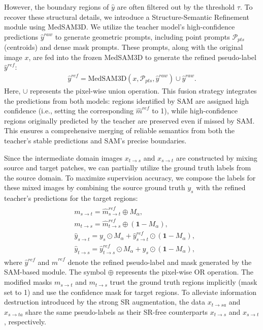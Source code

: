 However, the boundary regions of $\hat{y}$ are often filtered out by the threshold $\tau$. To recover these structural details, we introduce a Structure-Semantic Refinement module using MedSAM3D. We utilize the teacher model's high-confidence predictions $\hat{y}^{raw}$ to generate geometric prompts, including point prompts $\mathcal{P}_{pts}$ (centroids) and dense mask prompts. These prompts, along with the original image $x$, are fed into the frozen MedSAM3D to generate the refined pseudo-label $\hat{y}^{ref}$:
\begin{align} \label{eq4}
    \hat{y}^{ref} = \text{MedSAM3D}(x, \mathcal{P}_{pts}, \hat{y}^{raw}) \cup \hat{y}^{raw}.
\end{align}
Here, $\cup$ represents the pixel-wise union operation. This fusion strategy integrates the predictions from both models: regions identified by SAM are assigned high confidence (i.e., setting the corresponding $\hat{m}^{ref}$ to 1), while high-confidence regions originally predicted by the teacher are preserved even if missed by SAM. This ensures a comprehensive merging of reliable semantics from both the teacher's stable predictions and SAM's precise boundaries.

Since the intermediate domain images $x_{t\to s}$ and $x_{s\to t}$ are constructed by mixing source and target patches, we can partially utilize the ground truth labels from the source domain. To maximize supervision accuracy, we compose the labels for these mixed images by combining the source ground truth $y_{s}$ with the refined teacher's predictions for the target regions:
\begin{align}\label{eq5}
    \begin{split} 
           & m_{s\to t}  = \hat{m}_{s \to t}^{ref} \oplus \mathit{M}_{\alpha}, \\
           & m_{t\to s}  = \hat{m}_{t \to s}^{ref} \oplus (\mathbf{1} - \mathit{M}_{\alpha}),\\
           & \hat{y}_{s\to t} = y_{s} \odot \mathit{M}_{\alpha} + \hat{y}_{s\to t}^{ref} \odot (\mathbf{1} - \mathit{M}_{\alpha}), \\
           & \hat{y}_{t\to s} = \hat{y}_{t \to s}^{ref} \odot \mathit{M}_{\alpha} + y_{s} \odot (\mathbf{1} - \mathit{M}_{\alpha}),             
    \end{split} 
\end{align}
where $\hat{y}^{ref}$ and $\hat{m}^{ref}$ denote the refined pseudo-label and mask generated by the SAM-based module. The symbol $\oplus$ represents the pixel-wise OR operation. The modified masks $m_{s\to t}$ and $m_{t\to s}$ trust the ground truth regions implicitly (mask set to 1) and use the confidence mask for target regions. To alleviate information destruction introduced by the strong SR augmentation, the data $x_{t\to sa}$ and $x_{s\to ta}$ share the same pseudo-labels as their SR-free counterparts $x_{t\to s}$ and $x_{s\to t}$, respectively.

